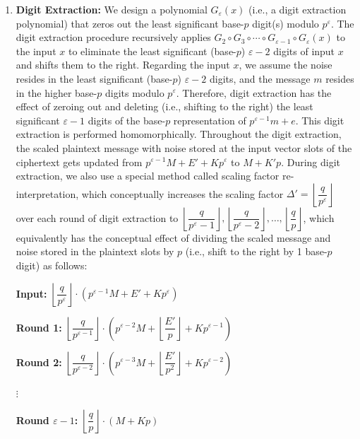 \begin{enumerate}
$ $

\item \textbf{Digit Extraction:} We design a polynomial $G_\varepsilon(x)$ (i.e., a digit extraction polynomial) that zeros out the least significant base-$p$  digit(s) modulo $p^{\varepsilon}$. The digit extraction procedure recursively applies $G_{2} \circ G_{3} \circ \cdots \circ G_{\varepsilon-1} \circ G_\varepsilon(x)$ to the input $x$ to eliminate the least significant (base-$p$) $\varepsilon-2$ digits of input $x$ and shifts them to the right. Regarding the input $x$, we assume the noise resides in the least significant (base-$p$) $\varepsilon-2$ digits, and the message $m$ resides in the higher base-$p$ digits modulo $p^{\varepsilon}$. Therefore, digit extraction has the effect of zeroing out and deleting (i.e., shifting to the right) the least significant $\varepsilon-1$ digits of the base-$p$ representation of $p^{\varepsilon-1}m + e$. This digit extraction is performed homomorphically. Throughout the digit extraction, the scaled plaintext message with noise stored at the input vector slots of the ciphertext gets updated from $p^{\varepsilon-1} M  + E' + Kp^\varepsilon$ to $M  + K'p$. During digit extraction, we also use a special method called scaling factor re-interpretation, which conceptually increases the scaling factor $\Delta'=\left\lfloor\dfrac{q}{p^\varepsilon}\right\rfloor$ over each round of digit extraction to $\left\lfloor\dfrac{q}{p^\varepsilon-1}\right\rfloor, \left\lfloor\dfrac{q}{p^\varepsilon-2}\right\rfloor, \ldots, \left\lfloor\dfrac{q}{p}\right\rfloor$, which equivalently has the conceptual effect of dividing the scaled message and noise stored in the plaintext slots by $p$ (i.e., shift to the right by 1 base-$p$ digit) as follows: 

\textbf{Input:} $\left\lfloor\dfrac{q}{p^{\varepsilon}}\right\rfloor \cdot \left (p^{\varepsilon-1}M + E' + K p^{\varepsilon}\right )$

\textbf{Round 1:} $\left\lfloor\dfrac{q}{p^{\varepsilon - 1}}\right\rfloor \cdot \left (p^{\varepsilon-2}M + \left\lfloor\dfrac{E'}{p}\right\rfloor + K p^{\varepsilon-1}\right )$

\textbf{Round 2:} $\left\lfloor\dfrac{q}{p^{\varepsilon - 2}}\right\rfloor \cdot \left (p^{\varepsilon-3}M + \left\lfloor\dfrac{E'}{p^2}\right\rfloor + K p^{\varepsilon-2}\right )$

$\vdots$

\textbf{Round $\varepsilon-1$:} $\left\lfloor\dfrac{q}{p}\right\rfloor \cdot (M + K p)$



\end{enumerate}
